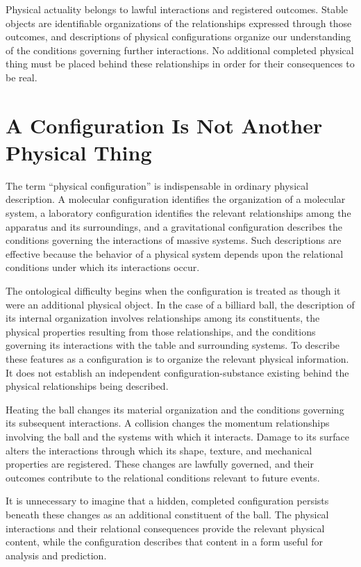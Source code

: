 \documentclass[12pt,onecolumn]{article}
\begin{document}
Physical actuality belongs to lawful interactions and registered outcomes. Stable objects are identifiable organizations of the relationships expressed through those outcomes, and descriptions of physical configurations organize our understanding of the conditions governing further interactions. No additional completed physical thing must be placed behind these relationships in order for their consequences to be real.

\section{A Configuration Is Not Another Physical Thing}

The term ``physical configuration'' is indispensable in ordinary physical description. A molecular configuration identifies the organization of a molecular system, a laboratory configuration identifies the relevant relationships among the apparatus and its surroundings, and a gravitational configuration describes the conditions governing the interactions of massive systems. Such descriptions are effective because the behavior of a physical system depends upon the relational conditions under which its interactions occur.

The ontological difficulty begins when the configuration is treated as though it were an additional physical object. In the case of a billiard ball, the description of its internal organization involves relationships among its constituents, the physical properties resulting from those relationships, and the conditions governing its interactions with the table and surrounding systems. To describe these features as a configuration is to organize the relevant physical information. It does not establish an independent configuration-substance existing behind the physical relationships being described.

Heating the ball changes its material organization and the conditions governing its subsequent interactions. A collision changes the momentum relationships involving the ball and the systems with which it interacts. Damage to its surface alters the interactions through which its shape, texture, and mechanical properties are registered. These changes are lawfully governed, and their outcomes contribute to the relational conditions relevant to future events.

It is unnecessary to imagine that a hidden, completed configuration persists beneath these changes as an additional constituent of the ball. The physical interactions and their relational consequences provide the relevant physical content, while the configuration describes that content in a form useful for analysis and prediction.
\end{document}
